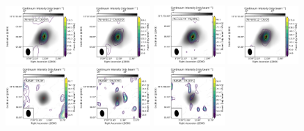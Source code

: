 \begin{figure}[htbp!]
  \centering
  \includegraphics[width=0.24\textwidth]{./moment0/Set2_ID02_CH3OH_243915.pdf}
  \includegraphics[width=0.24\textwidth]{./moment0/Set2_ID02_CH3OCHO_259342.pdf}
  \includegraphics[width=0.24\textwidth]{./moment0/Set2_ID02_CH3OCH3_259311.pdf}
  \includegraphics[width=0.24\textwidth]{./moment0/Set2_ID02_CH3CN_257527.pdf}
  \\
  \includegraphics[width=0.24\textwidth]{./moment0/Set2_ID02_2_CH3OH_243915.pdf}
  \includegraphics[width=0.24\textwidth]{./moment0/Set2_ID02_2_CH3OCHO_259342.pdf}
  \includegraphics[width=0.24\textwidth]{./moment0/Set2_ID02_2_CH3OCH3_259311.pdf}

\end{figure}
